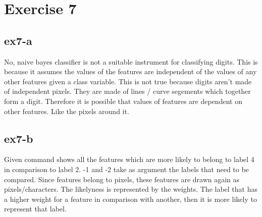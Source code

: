 \section{Exercise 7}
\subsection{ex7-a}
No, naive bayes classifier is not a suitable instrument for classifying digits. This is because it assumes the values of the
features are independent of the values of any other features given a class variable. This is not true because digits
aren't made of independent pixels. They are made of lines / curve segements which together form a digit. Therefore it
is possible that values of features are dependent on other features. Like the pixels around it. 

\subsection{ex7-b}
Given command shows all the features which are more likely to belong to label 4 in comparison to label 2. -1 and -2 take
as argument the labels that need to be compared. Since features belong to pixels, these features are drawn again as
pixels/characters. The likelyness is represented by the weights. The label that has a higher weight for a feature in
comparison with another, then it is more likely to represent that label.

